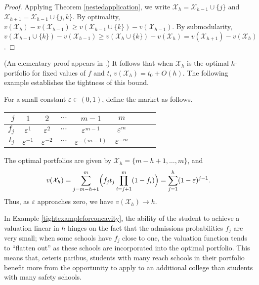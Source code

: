\begin{proof}
Applying Theorem \ref{nestedapplication}, we write $\mathcal{X}_h = \mathcal{X}_{h-1} \cup\{j\}$ and $\mathcal{X}_{h+1} = \mathcal{X}_{h-1} \cup\{j, k\}$. By optimality, $v(\mathcal{X}_h) - v(\mathcal{X}_{h-1}) \geq v(\mathcal{X}_{h-1}\cup\{k\}) - v(\mathcal{X}_{h-1})$. By submodularity, $v(\mathcal{X}_{h-1}\cup\{k\}) - v(\mathcal{X}_{h-1}) \geq  v(\mathcal{X}_{h}\cup\{k\}) - v(\mathcal{X}_{h}) = v(\mathcal{X}_{h+1}) - v(\mathcal{X}_{h})$.
\end{proof}

\noindent (An elementary proof appears in \cite{kapur2022}.) It follows that when $\mathcal{X}_h$ is the optimal $h$-portfolio for fixed values of $f$ and $t$, $v(\mathcal{X}_h) = t_0 + O(h)$. The following example establishes the tightness of this bound.

\begin{example} \label{tightexampleforconcavity}
For a small constant $\varepsilon \in (0, 1)$, define the market as follows.
\begin{center}
\begin{tabular}{r|cccccccc}
$j$   & $1$ & $2$ & $\cdots$ & $m-1$ & $m$ \\ \hline
$f_j$ & $\varepsilon^{1}$ & $\varepsilon^{2}$ & $\cdots$ & $\varepsilon^{m-1}$ & $\varepsilon^{m}$ \\
$t_j$ & $\varepsilon^{-1}$ & $\varepsilon^{-2}$ & $\cdots$ & $\varepsilon^{-(m-1)}$ & $\varepsilon^{-m}$
\end{tabular}%
\end{center}
The optimal portfolios are given by $\mathcal{X}_h = \{m-h + 1, \dots, m\}$, and 
\begin{equation*}
v(\mathcal{X}_h) = \sum_{j= m-h +1}^m \Bigl( f_j t_j \prod_{i = j+1}^m (1 - f_{i}) \Bigr) =  \sum_{j= 1}^h  (1 - \varepsilon)^{j-1}.
\end{equation*}
Thus, as $\varepsilon$ approaches zero, we have $v(\mathcal{X}_h) \to h$.
\end{example}

In Example \ref{tightexampleforconcavity}, the ability of the student to achieve a valuation linear in $h$ hinges on the fact that the admissions probabilities $f_j$ are very small; when some schools have $f_j$ close to one, the valuation function tends to ``flatten out'' as these schools are incorporated into the optimal portfolio. This means that, ceteris paribus, students with many reach schools in their portfolio benefit more from the opportunity to apply to an additional college than students with many safety schools.

